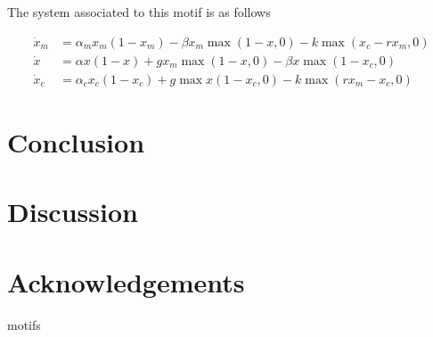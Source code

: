 \documentclass{article}
\begin{document}
The system associated to this motif is as follows

\begin{equation}
\begin{array}{cl}
    \dot x_m  & = \alpha_m x_m(1-x_m) - \beta x_m\max(1-x, 0) - k \max (x_c- rx_m, 0)  \\
     \dot x &= \alpha x(1-x) + g x_m\max(1-x, 0) - \beta x \max  (1-x_c, 0) \\
     \dot x_c & = \alpha_c x_c(1-x_c) + g\max x (1-x_c, 0) - k \max (rx_m - x_c, 0) 
\end{array}
\end{equation}

\section{Conclusion}
\section{Discussion}
\section*{Acknowledgements}



motifs
\end{document}
